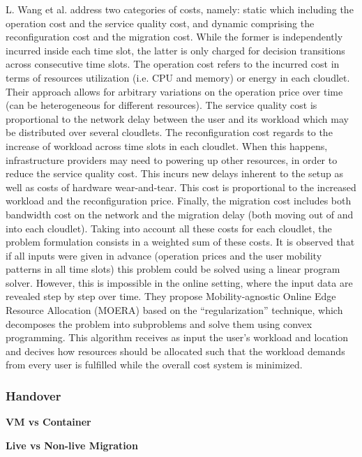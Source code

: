 \noindent\tab L. Wang \cite{wang2018moera} et al. address two categories of costs, namely: static which including the operation cost and the service quality cost, and dynamic comprising the reconfiguration cost and the migration cost. While the former is independently incurred inside each time slot, the latter is only charged for decision transitions across consecutive time slots. The operation cost refers to the incurred cost in terms of resources utilization (i.e. CPU and memory) or energy in each cloudlet. Their approach allows for arbitrary variations on the operation price over time (can be heterogeneous for different resources). The service quality cost is proportional to the network delay between the user and its workload which may be distributed over several cloudlets. The reconfiguration cost regards to the increase of workload across time slots in each cloudlet. When this happens, infrastructure providers may need to powering up other resources, in order to reduce the service quality cost. This incurs new delays inherent to the setup as well as costs of hardware wear-and-tear. This cost is proportional to the increased workload and the reconfiguration price. Finally, the migration cost includes both bandwidth cost on the network and the migration delay (both moving out of and into each cloudlet). Taking into account all these costs for each cloudlet, the problem formulation consists in a weighted sum of these costs. It is observed that if all inputs were given in advance (operation prices and the user mobility patterns in all time slots) this problem could be solved using a linear program solver. However, this is impossible in the online setting, where
the input data are revealed step by step over time. They propose Mobility-agnostic Online Edge Resource Allocation (MOERA) based on the ``regularization'' technique, which decomposes the problem into subproblems and solve them using convex programming. This algorithm receives as input the user’s workload and location and decives how resources should be allocated such that the workload demands from every user is fulfilled while the overall cost system is minimized.

\subsubsection{Handover}

\textbf{VM vs Container}

\textbf{Live vs Non-live Migration}

